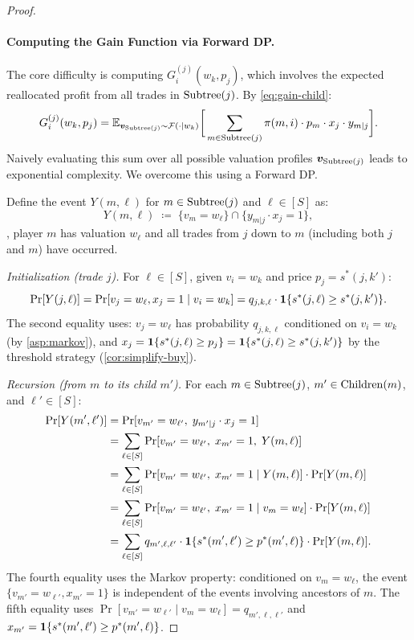 \begin{proof}
\paragraph{Computing the Gain Function via Forward DP.}
The core difficulty is computing $G^{(j)}_i(w_k, p_j)$, which involves the expected reallocated profit from all trades in $\operatorname{Subtree}(j)$. By \cref{eq:gain-child}:
\begin{equation}
\label{eq:prf:algo:gain-expand}
G^{(j)}_i(w_k, p_j) = \mathbb{E}_{{\bm{v}}_{\operatorname{Subtree}(j)} \sim \mathcal{F}(\cdot|w_k)}\bigg[\sum_{m \in \operatorname{Subtree}(j)} \pi(m,i) \cdot p_m \cdot x_j \cdot y_{m|j}\bigg].
\end{equation}
Naively evaluating this sum over all possible valuation profiles ${\bm{v}}_{\operatorname{Subtree}(j)}$ leads to exponential complexity. We overcome this using a Forward DP.

Define the event $Y(m, \ell)$ for $m \in \operatorname{Subtree}(j)$ and $\ell \in [S]$ as:
\[
Y(m, \ell) \;\coloneqq\; \{v_m = w_\ell\} \cap \{y_{m|j} \cdot x_j = 1\},
\]
\ie, player $m$ has valuation $w_\ell$ and all trades from $j$ down to $m$ (including both $j$ and $m$) have occurred.

\emph{Initialization (trade $j$).} For $\ell \in [S]$, given $v_i = w_k$ and price $p_j = s^*(j,k')$:
\begin{equation}
\label{eq:prf:algo:Y-init}
\Pr[Y(j, \ell)] = \Pr[v_j = w_\ell, x_j = 1 \mid v_i = w_k] = q_{j,k,\ell} \cdot \bm{1}\{s^*(j,\ell) \ge s^*(j,k')\}.
\end{equation}
The second equality uses: $v_j = w_\ell$ has probability $q_{j,k,\ell}$ conditioned on $v_i = w_k$ (by \cref{asp:markov}), and $x_j = \bm{1}\{s^*(j,\ell) \ge p_j\} = \bm{1}\{s^*(j,\ell) \ge s^*(j,k')\}$ by the threshold strategy (\cref{cor:simplify-buy}).

\emph{Recursion (from $m$ to its child $m'$).} For each $m \in \operatorname{Subtree}(j)$, $m' \in \operatorname{Children}(m)$, and $\ell' \in [S]$:
\begin{equation}
\label{eq:prf:algo:Y-recurse}
\begin{aligned}
\Pr[Y(m', \ell')] &= \Pr[v_{m'} = w_{\ell'},\; y_{m'|j} \cdot x_j = 1] \\
&= \sum_{\ell \in [S]} \Pr[v_{m'} = w_{\ell'},\; x_{m'} = 1,\; Y(m,\ell)] \\
&= \sum_{\ell \in [S]} \Pr[v_{m'} = w_{\ell'},\; x_{m'} = 1 \mid Y(m,\ell)] \cdot \Pr[Y(m,\ell)] \\
&= \sum_{\ell \in [S]} \Pr[v_{m'} = w_{\ell'},\; x_{m'} = 1 \mid v_m = w_\ell] \cdot \Pr[Y(m,\ell)] \\
&= \sum_{\ell \in [S]} q_{m',\ell,\ell'} \cdot \bm{1}\{s^*(m',\ell') \ge p^*(m',\ell)\} \cdot \Pr[Y(m,\ell)].
\end{aligned}
\end{equation}
The fourth equality uses the Markov property: conditioned on $v_m = w_\ell$, the event $\{v_{m'} = w_{\ell'}, x_{m'} = 1\}$ is independent of the events involving ancestors of $m$. The fifth equality uses $\Pr[v_{m'} = w_{\ell'} \mid v_m = w_\ell] = q_{m',\ell,\ell'}$ and $x_{m'} = \bm{1}\{s^*(m',\ell') \ge p^*(m',\ell)\}$.


\end{proof}
